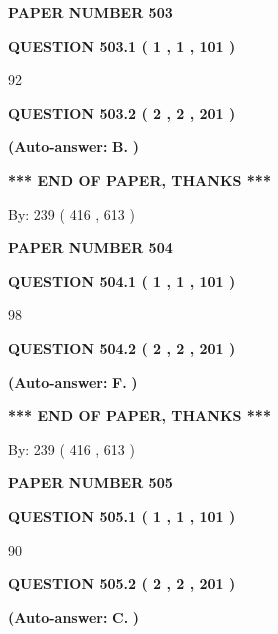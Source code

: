 \documentclass{ctexart}
\begin{document}
   
 {\textbf{ \Large{ PAPER NUMBER  503  }}}
   
   
   
   
  
  
{\textbf{\large{QUESTION
503.1 
 ( 1 , 1 , 101 )
}}}

92
  
  
{\textbf{\large{QUESTION
503.2 
 ( 2 , 2 , 201 )
}}}
 
 
{\textbf{(Auto-answer:}}
{\textbf{\large{
B.}}}
{\textbf{)}}
 
 
   
   
   
   
\vspace{1.0in} 
{\textbf{\large{ *** END OF PAPER, THANKS *** }}} 
   
   
\hspace{1.0in} By: 
 239 ( 416 ,  613 )
   
   
   
   
\newpage 
\setcounter{page}{ 
   504001 } 
   
   
 {\textbf{ \Large{ PAPER NUMBER  504  }}}
   
   
   
   
  
  
{\textbf{\large{QUESTION
504.1 
 ( 1 , 1 , 101 )
}}}

98
  
  
{\textbf{\large{QUESTION
504.2 
 ( 2 , 2 , 201 )
}}}
 
 
{\textbf{(Auto-answer:}}
{\textbf{\large{
F.}}}
{\textbf{)}}
 
 
   
   
   
   
\vspace{1.0in} 
{\textbf{\large{ *** END OF PAPER, THANKS *** }}} 
   
   
\hspace{1.0in} By: 
 239 ( 416 ,  613 )
   
   
   
   
\newpage 
\setcounter{page}{ 
   505001 } 
   
   
 {\textbf{ \Large{ PAPER NUMBER  505  }}}
   
   
   
   
  
  
{\textbf{\large{QUESTION
505.1 
 ( 1 , 1 , 101 )
}}}

90
  
  
{\textbf{\large{QUESTION
505.2 
 ( 2 , 2 , 201 )
}}}
 
 
{\textbf{(Auto-answer:}}
{\textbf{\large{
C.}}}
{\textbf{)}}
 
\end{document}
